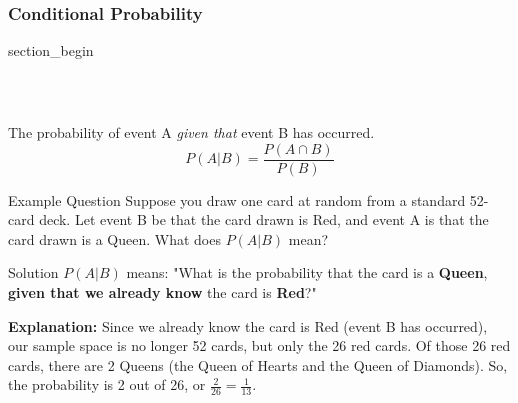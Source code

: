 \subsubsection{Conditional Probability}
\begin{frame} \vfill \centering \begin{beamercolorbox}[sep=10pt,center,shadow=false,rounded=true]{section_begin} \insertsubsubsectionhead\par \end{beamercolorbox} \vfill \end{frame}
\begin{frame}[t]
\frametitle{\ }
\vspace{-8mm}
\footnotesize
\begin{Definisi}
    The probability of event A \textit{given that} event B has occurred.
    \[ P(A|B) = \frac{P(A \cap B)}{P(B)} \]
\end{Definisi}
\vspace{-3mm}
\begin{block}{Example Question}
Suppose you draw one card at random from a standard 52-card deck. Let event B be that the card drawn is Red, and event A is that the card drawn is a Queen. What does \( P(A|B) \) mean?
\end{block}
\begin{exampleblock}{Solution}
\( P(A|B) \) means: "What is the probability that the card is a \textbf{Queen}, \textbf{given that we already know} the card is \textbf{Red}?"

\vspace{0.5mm}
\textbf{Explanation:}
Since we already know the card is Red (event B has occurred), our sample space is no longer 52 cards, but only the 26 red cards. Of those 26 red cards, there are 2 Queens (the Queen of Hearts and the Queen of Diamonds). So, the probability is 2 out of 26, or \( \frac{2}{26} = \frac{1}{13} \).
\end{exampleblock}
\end{frame}

